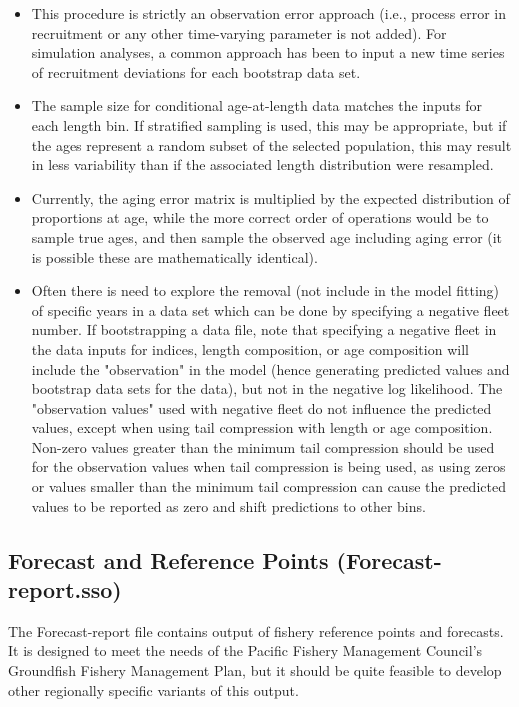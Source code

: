 \begin{itemize}
	\item This procedure is strictly an observation error approach (i.e., process error in recruitment or any other time-varying parameter is not added). For simulation analyses, a common approach has been to input a new time series of recruitment deviations for each bootstrap data set.
	
	\item The sample size for conditional age-at-length data matches the inputs for each length bin. If stratified sampling is used, this may be appropriate, but if the ages represent a random subset of the selected population, this may result in less variability than if the associated length distribution were resampled.
	
	\item Currently, the aging error matrix is multiplied by the expected distribution of proportions at age, while the more correct order of operations would be to sample true ages, and then sample the observed age including aging error (it is possible these are mathematically identical).
	
	\item Often there is need to explore the removal (not include in the model fitting) of specific years in a data set which can be done by specifying a negative fleet number. If bootstrapping a data file, note that specifying a negative fleet in the data inputs for indices, length composition, or age composition will include the "observation" in the model (hence generating predicted values and bootstrap data sets for the data), but not in the negative log likelihood. The "observation values" used with negative fleet do not influence the predicted values, except when using tail compression with length or age composition. Non-zero values greater than the minimum tail compression should be used for the observation values when tail compression is being used, as using zeros or values smaller than the minimum tail compression can cause the predicted values to be reported as zero and shift predictions to other bins.
\end{itemize}

\subsection{Forecast and Reference Points (Forecast-report.sso)}
The Forecast-report file contains output of fishery reference points and forecasts.  It is designed to meet the needs of the Pacific Fishery Management Council's Groundfish Fishery Management Plan, but it should be quite feasible to develop other regionally specific variants of this output.

